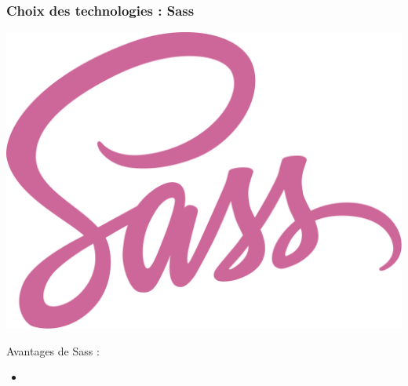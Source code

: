 \begin{frame}
    \frametitle{Choix des technologies : Sass}

    \begin{minipage}{0.48\textwidth}
        \centering
        \includegraphics[width=\linewidth]{pictures/sass.png}
    \end{minipage}
    \hfill
    \begin{minipage}{0.48\textwidth}
        \centering
	Avantages de Sass : 
	\begin{itemize}
	    \item 
	\end{itemize}
    \end{minipage}
\end{frame}

